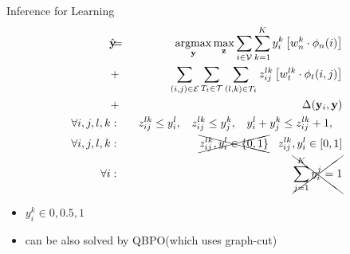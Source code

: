 \documentclass{beamer}
\DeclareMathOperator*{\argmax}{argmax}
\newcommand{\y}{{\mathbf y}}     %
\newcommand{\ysc}[2]{{y_{#1}^{#2}}}    %
\newcommand{\zsc}[2]{{z_{#1}^{#2}}}    %
\newcommand{\fn}[1]{{\phi_n(#1)}}      %
\newcommand{\fe}[3]{{\phi_{#1}(#2,#3)}}%
\newcommand{\wn}[1]{{w_n^{#1}}}        %
\newcommand{\we}[3]{{w_{#1}^{#2#3}}}   %
\newcommand{\loss}[2]{{\Delta(#1,#2)}}   %
\begin{document}

\begin{frame}{Inference for Learning}
 \begin{eqnarray*}
\hat{\y}\!\!\!&=&\!\!\!\argmax_{\y}\max_{\mathbf z} \sum_{i \in \mathcal{V}} \sum_{k=1}^{K} \ysc{i}{k} \left[\wn{k} \cdot \fn{i} \right] \\
&+&  \!\!\!\sum_{(i,j)\in \mathcal{E}}  \sum_{T_t \in {\cal T}} \sum_{(l,k)\in T_t} \zsc{ij}{lk} \left[\we{t}{l}{k} \cdot \fe{t}{i}{j}\right] \\
&+& \loss{\y_i}{\y} \label{eq:relaxobj}\\
\forall i,j,l,k &:& \:\: \zsc{ij}{lk}\le \ysc{i}{l}, \:\:\:\:
\zsc{ij}{lk}\le \ysc{j}{k},\:\:\:\:
\ysc{i}{l} + \ysc{j}{k} \le \zsc{ij}{lk}+1,\:\:\:\: \\
\forall i,j,l,k &:& \xcancel{ \zsc{ij}{lk},\ysc{i}{l} \in \{ 0,1 \} } \;\;\; \zsc{ij}{lk},\ysc{i}{l} \in [ 0,1 ] \\
\forall i &:& \xcancel{\sum_{j=1}^{K} y_i^j = 1 }
\end{eqnarray*} 

\begin{itemize}
 \item $y_i^k\in{0,0.5,1}$
 \item can be also solved by QBPO(which uses graph-cut)
\end{itemize}

\end{frame}
\end{document}

